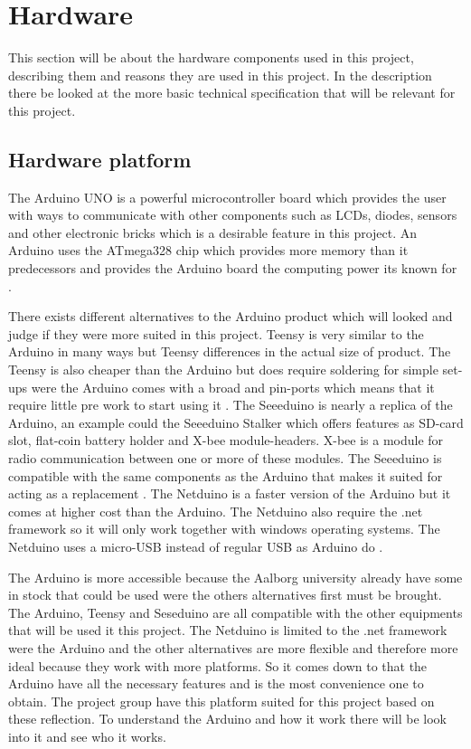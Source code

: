 \section{Hardware}
This section will be about the hardware components used in this project, describing them and reasons they are used in this project. In the description there be looked at the more basic technical specification that will be relevant for this project.

\subsection{Hardware platform}
The Arduino UNO is a powerful microcontroller board which provides the user with ways to communicate with other components such as LCDs, diodes, sensors and other electronic bricks which is a desirable feature in this project. An Arduino uses the ATmega328 chip which provides more memory than it predecessors and provides the Arduino board the computing power its known for \citep{ArduinoUno}.

There exists different alternatives to the Arduino product which will looked and judge if they were more suited in this project. Teensy is very similar to the Arduino in many ways but Teensy differences in the actual size of product. The Teensy is also cheaper than the Arduino but does require soldering for simple set-ups were the Arduino comes with a broad and pin-ports which means that it require little pre work to start using it \citep{Teensy}.
The Seeeduino is nearly a replica of the Arduino, an example could the Seeeduino Stalker which offers features as SD-card slot, flat-coin battery holder and X-bee module-headers. X-bee is a module for radio communication between one or more of these modules. The Seeeduino is compatible with the same components as the Arduino that makes it suited for acting as a replacement \citep{Seedui}.
The Netduino is a faster version of the Arduino but it comes at higher cost than the Arduino. The Netduino also require the .net framework so it will only work together with windows operating systems. The Netduino uses a micro-USB instead of regular USB as Arduino do \citep{Netdui}.

The Arduino is more accessible because the Aalborg university already have some in stock that could be used were the others alternatives first must be brought. The Arduino, Teensy and Seseduino are all compatible with the other equipments that will be used it this project. The Netduino is limited to the .net framework were the Arduino and the other alternatives are more flexible and therefore more ideal because they work with more platforms.
So it comes down to that the Arduino have all the necessary features and is the most convenience one to obtain. The project group have  this platform suited for this project based on these reflection. To understand the Arduino and how it work there will be look into it and see who it works.

